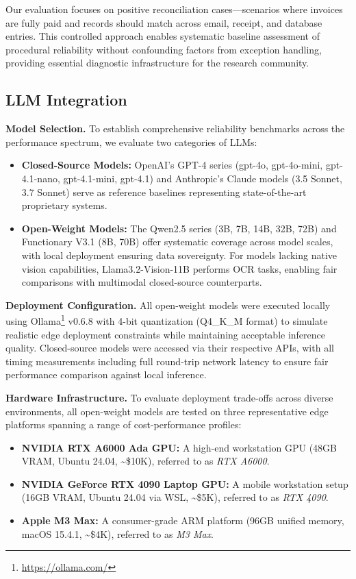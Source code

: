 \documentclass[conference]{IEEEtran}
\begin{document}
Our evaluation focuses on positive reconciliation cases—scenarios where invoices are fully paid and records should match across email, receipt, and database entries. This controlled approach enables systematic baseline assessment of procedural reliability without confounding factors from exception handling, providing essential diagnostic infrastructure for the research community.

\subsection{LLM Integration}

\textbf{Model Selection.} To establish comprehensive reliability benchmarks across the performance spectrum, we evaluate two categories of LLMs:

\begin{itemize}
\item \textbf{Closed-Source Models:} OpenAI's GPT-4 series (gpt-4o, gpt-4o-mini, gpt-4.1-nano, gpt-4.1-mini, gpt-4.1) and Anthropic's Claude models (3.5 Sonnet, 3.7 Sonnet) serve as reference baselines representing state-of-the-art proprietary systems.

\item \textbf{Open-Weight Models:} The Qwen2.5 series (3B, 7B, 14B, 32B, 72B) and Functionary V3.1 (8B, 70B) offer systematic coverage across model scales, with local deployment ensuring data sovereignty. For models lacking native vision capabilities, Llama3.2-Vision-11B performs OCR tasks, enabling fair comparisons with multimodal closed-source counterparts.
\end{itemize}

\textbf{Deployment Configuration.} All open-weight models were executed locally using Ollama\footnote{\url{https://ollama.com/}} v0.6.8 with 4-bit quantization (Q4\_K\_M format) to simulate realistic edge deployment constraints while maintaining acceptable inference quality. Closed-source models were accessed via their respective APIs, with all timing measurements including full round-trip network latency to ensure fair performance comparison against local inference.

\textbf{Hardware Infrastructure.} To evaluate deployment trade-offs across diverse environments, all open-weight models are tested on three representative edge platforms spanning a range of cost-performance profiles:

\begin{itemize}
\item \textbf{NVIDIA RTX A6000 Ada GPU:} A high-end workstation GPU (48GB VRAM, Ubuntu 24.04, \textasciitilde\$10K), referred to as \textit{RTX A6000}.

\item \textbf{NVIDIA GeForce RTX 4090 Laptop GPU:} A mobile workstation setup (16GB VRAM, Ubuntu 24.04 via WSL, \textasciitilde\$5K), referred to as \textit{RTX 4090}.

\item \textbf{Apple M3 Max:} A consumer-grade ARM platform (96GB unified memory, macOS 15.4.1, \textasciitilde\$4K), referred to as \textit{M3 Max}.
\end{itemize}
\end{document}
